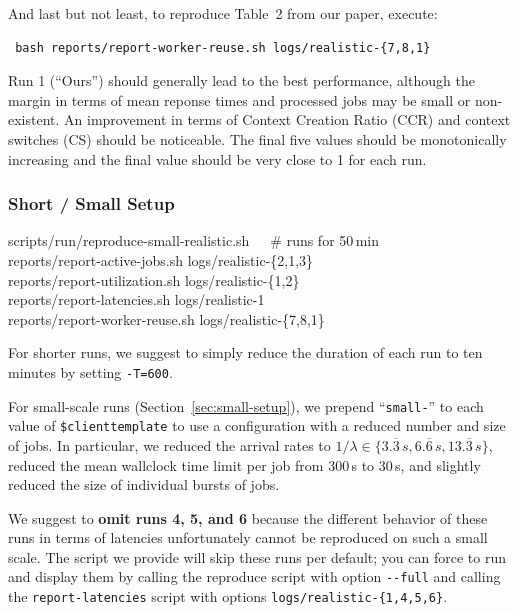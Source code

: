 \documentclass[runningheads]{article}
\numberwithin{dummy}{subsection}
\begin{document}
And last but not least, to reproduce Table~2 from our paper, execute:
\begin{verbatim}
 bash reports/report-worker-reuse.sh logs/realistic-{7,8,1}
\end{verbatim}
Run 1 (``Ours'') should generally lead to the best performance, although the margin in terms of mean reponse times and processed jobs may be small or non-existent.
An improvement in terms of Context Creation Ratio (CCR) and context switches (CS) should be noticeable.
The final five values should be monotonically increasing and the final value should be very close to 1 for each run.

\subsubsection{Short / Small Setup}

\begin{tcolorbox}[
  colback=Magenta!5!white,
  colframe=Magenta!75!black,
  title={\centering Commands for Small Setup}]
\begin{ttfenvcompact}
scripts/run/reproduce-small-realistic.sh\ \ \ \# runs for 50\,min\\
reports/report-active-jobs.sh logs/realistic-\{2,1,3\}\\
reports/report-utilization.sh logs/realistic-\{1,2\}\\
reports/report-latencies.sh logs/realistic-1\\
reports/report-worker-reuse.sh logs/realistic-\{7,8,1\}
\end{ttfenvcompact}
\end{tcolorbox}

For shorter runs, we suggest to simply reduce the duration of each run to ten minutes by setting \texttt{-T=600}.

For small-scale runs (Section~\ref{sec:small-setup}), we prepend ``\texttt{small-}'' to each value of \texttt{\$clienttemplate} to use a configuration with a reduced number and size of jobs.
In particular, we reduced the arrival rates to $1/\lambda \in \{3.\overline{3}\,s, 6.\overline{6}\,s, 13.\overline{3}\,s\}$, reduced the mean wallclock time limit per job from 300\,s to 30\,s, and slightly reduced the size of individual bursts of jobs.

We suggest to \textbf{omit runs 4, 5, and 6} because the different behavior of these runs in terms of latencies unfortunately cannot be reproduced on such a small scale.
The script we provide will skip these runs per default; you can force to run and display them by calling the reproduce script with option \texttt{-{}-full} and calling the \texttt{report-latencies} script with options \texttt{logs/realistic-\{1,4,5,6\}}.
\end{document}
